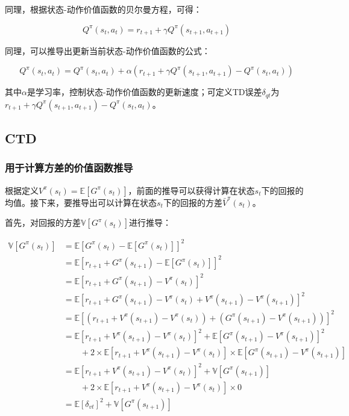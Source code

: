 \documentclass[UTF8]{ctexart}
\begin{document}
同理，根据状态-动作价值函数的贝尔曼方程，可得：

$$Q^{\pi}(s_t, a_t) = r_{t+1} + \gamma Q^{\pi}(s_{t+1}, a_{t+1})$$

同理，可以推导出更新当前状态-动作价值函数的公式：

$$
Q^{\pi}(s_t, a_t) = Q^{\pi}(s_t, a_t) + \alpha (r_{t+1} + \gamma Q^{\pi}(s_{t+1}, a_{t+1}) - Q^{\pi}(s_t, a_t))
$$

其中$\alpha$是学习率，控制状态-动作价值函数的更新速度；可定义TD误差$\delta_{qt}$为$r_{t+1} + \gamma Q^{\pi}(s_{t+1}, a_{t+1}) - Q^{\pi}(s_t, a_t)$。

\subsection{CTD}

\subsubsection{用于计算方差的价值函数推导}

根据定义$V^{\pi}(s_t) = \mathbb{E}[G^{\pi}(s_t)]$，前面的推导可以获得计算在状态$s_t$下的回报的均值。接下来，要推导出可以计算在状态$s_t$下的回报的方差$\bar{V}^{\pi}(s_t)$。

首先，对回报的方差$\mathbb{V}[G^{\pi}(s_t)]$进行推导：

\begin{align*}
	\mathbb{V}[G^{\pi}(s_t)] &= \mathbb{E}[ G^{\pi}(s_{t}) - \mathbb{E}[G^{\pi}(s_t)]]^2 \\
	&= \mathbb{E}[r_{t+1} + G^{\pi}(s_{t+1}) - \mathbb{E}[G^{\pi}(s_t)]]^2 \\
	&= \mathbb{E}[r_{t+1} + G^{\pi}(s_{t+1}) - V^{\pi}(s_t)]^2 \\
	&= \mathbb{E}[r_{t+1} + G^{\pi}(s_{t+1}) - V^{\pi}(s_t) + V^{\pi}(s_{t+1}) - V^{\pi}(s_{t+1})]^2 \\
	&= \mathbb{E}[(r_{t+1} + V^{\pi}(s_{t+1}) - V^{\pi}(s_t)) + (G^{\pi}(s_{t+1}) - V^{\pi}(s_{t+1}))]^2 \\
	&= \mathbb{E}[r_{t+1} + V^{\pi}(s_{t+1}) - V^{\pi}(s_t)]^2 + \mathbb{E}[G^{\pi}(s_{t+1}) - V^{\pi}(s_{t+1})]^2 \\
	&\qquad+ 2 \times \mathbb{E}[r_{t+1} + V^{\pi}(s_{t+1}) - V^{\pi}(s_t)] \times  \mathbb{E}[G^{\pi}(s_{t+1}) - V^{\pi}(s_{t+1})] \\
	&= \mathbb{E}[r_{t+1} + V^{\pi}(s_{t+1}) - V^{\pi}(s_t)]^2 + \mathbb{V}[G^{\pi}(s_{t+1})] \\
	&\qquad + 2 \times \mathbb{E}[r_{t+1} + V^{\pi}(s_{t+1}) - V^{\pi}(s_t)] \times 0 \\
	&= \mathbb{E}[\delta_{vt}]^2 + \mathbb{V}[G^{\pi}(s_{t+1})] \\
\end{align*}
\end{document}
